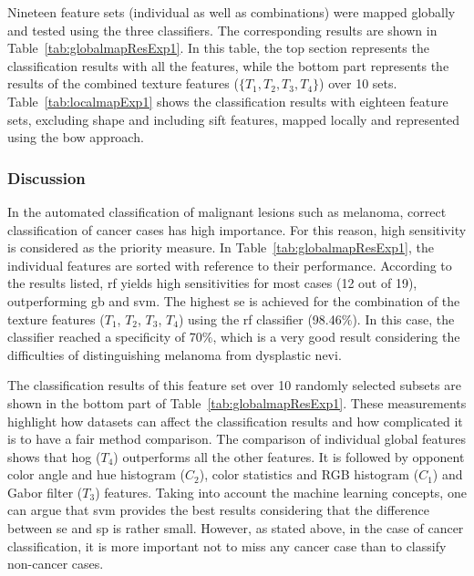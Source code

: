 Nineteen feature sets (individual as well as combinations) were mapped globally and tested using the three classifiers. The corresponding results are shown in Table~\ref{tab:globalmapResExp1}. 
In this table, the top section represents the classification results with all the features, while the bottom part represents the results of the combined texture features ($\{T_1,T_2,T_3,T_4\}$) over 10 sets.
Table~\ref{tab:localmapExp1} shows the classification results with eighteen feature sets, excluding shape and including \ac{sift} features, mapped locally and represented using the \ac{bow} approach.



\subsubsection{Discussion}

In the automated classification of malignant lesions such as melanoma, correct classification of cancer cases has high importance.
For this reason, high sensitivity is considered as the priority measure. 
In Table~\ref{tab:globalmapResExp1}, the individual features are sorted with reference to their performance.
According to the results listed, \ac{rf} yields high sensitivities for most cases (12 out of 19), outperforming \ac{gb} and \ac{svm}. 
The highest \ac{se} is achieved for the combination of the texture features ($T_{1}$, $T_{2}$, $T_{3}$, $T_{4}$) using the \ac{rf} classifier (98.46$\%$).
In this case, the classifier reached a specificity of 70$\%$, which is a very good result considering the difficulties of distinguishing melanoma from dysplastic nevi.

The classification results of this feature set over 10 randomly selected subsets are shown in the bottom part of Table~\ref{tab:globalmapResExp1}. 
These measurements highlight how datasets can affect the classification results and how complicated it is to have a fair method comparison. 
The comparison of individual global features shows that \ac{hog} ($T_4$) outperforms all the other features. 
It is followed by opponent color angle and hue histogram ($C_2$), color statistics and RGB histogram ($C_1$) and Gabor filter ($T_3$) features.
Taking into account the machine learning concepts, one can argue that \ac{svm} provides the best results considering that the difference between \ac{se} and \ac{sp} is rather small. However, as stated above, in the case of cancer classification, it is more important not to miss any cancer case than to classify non-cancer cases.

